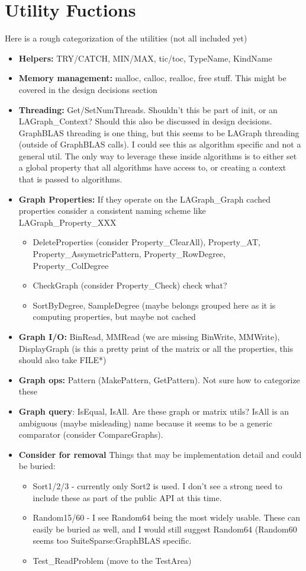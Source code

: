 \section{Utility Fuctions}
\label{sec:utility}

Here is a rough categorization of the utilities (not all included yet)
\begin{itemize}
\item {\bf Helpers:} TRY/CATCH, MIN/MAX, tic/toc, TypeName, KindName
\item {\bf Memory management:} malloc, calloc, realloc, free stuff.  This might be covered in the design decisions section
\item {\bf Threading:} Get/SetNumThreads. Shouldn’t this be part of init, or an LAGraph\_Context?  Should this also be discussed in design decisions.  GraphBLAS threading is one thing, but this seems to be LAGraph threading (outside of GraphBLAS calls).  I could see this as algorithm specific and not a general util.  The only way to leverage these inside algorithms is to either set a global property that all algorithms have access to, or creating a context that is passed to algorithms.
\item {\bf Graph Properties:} If they operate on the LAGraph\_Graph cached properties consider a consistent naming scheme like LAGraph\_Property\_XXX
\begin{itemize}
  \item DeleteProperties (consider Property\_ClearAll), Property\_AT, Property\_AssymetricPattern, Property\_RowDegree, Property\_ColDegree
  \item CheckGraph (consider Property\_Check)  check what?
  \item SortByDegree, SampleDegree  (maybe belongs grouped here as it is computing properties, but maybe not cached
\end{itemize}
\item {\bf Graph I/O:} BinRead, MMRead (we are missing BinWrite, MMWrite), DisplayGraph (is this a pretty print of the matrix or all the properties, this should also take FILE*)
\item {\bf Graph ops:} Pattern (MakePattern, GetPattern).  Not sure how to categorize these
\item {\bf Graph query}: IsEqual, IsAll. Are these graph or matrix utils? IsAll is an ambiguous (maybe misleading) name because it seems to be a generic comparator (consider CompareGraphs).
\item {\bf Consider for removal} Things that may be implementation detail and could be buried:
\begin{itemize}
  \item Sort1/2/3 - currently only Sort2 is used.  I don't see a strong need to include these as part of the public API at this time.
  \item Random15/60 - I see Random64 being the most widely usable. These can easily be buried as well, and I would still suggest Random64 (Random60 seems too SuiteSparse:GraphBLAS specific.
  \item Test\_ReadProblem (move to the TestArea)
\end{itemize}
\end{itemize}